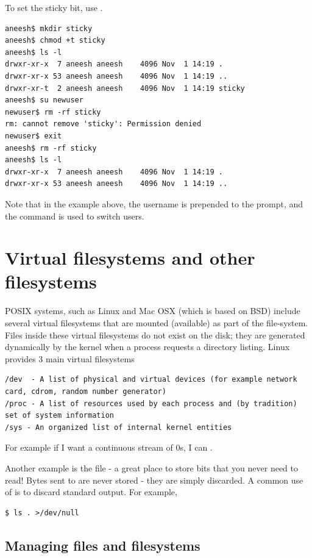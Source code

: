 To set the sticky bit, use .

\begin{lstlisting}
aneesh$ mkdir sticky
aneesh$ chmod +t sticky
aneesh$ ls -l
drwxr-xr-x  7 aneesh aneesh    4096 Nov  1 14:19 .
drwxr-xr-x 53 aneesh aneesh    4096 Nov  1 14:19 ..
drwxr-xr-t  2 aneesh aneesh    4096 Nov  1 14:19 sticky
aneesh$ su newuser
newuser$ rm -rf sticky
rm: cannot remove 'sticky': Permission denied
newuser$ exit
aneesh$ rm -rf sticky
aneesh$ ls -l
drwxr-xr-x  7 aneesh aneesh    4096 Nov  1 14:19 .
drwxr-xr-x 53 aneesh aneesh    4096 Nov  1 14:19 ..
\end{lstlisting}

Note that in the example above, the username is prepended to the prompt, and the command  is used to switch users.

\section{Virtual filesystems and other filesystems}

POSIX systems, such as Linux and Mac OSX (which is based on BSD) include several virtual filesystems that are mounted (available) as part of the file-system. Files inside these virtual filesystems do not exist on the disk; they are generated dynamically by the kernel when a process requests a directory listing. Linux provides 3 main virtual filesystems

\begin{lstlisting}
/dev  - A list of physical and virtual devices (for example network card, cdrom, random number generator)
/proc - A list of resources used by each process and (by tradition) set of system information
/sys - An organized list of internal kernel entities
\end{lstlisting}

For example if I want a continuous stream of 0s, I can .

Another example is the file  - a great place to store bits that you never need to read! Bytes sent to  are never stored - they are simply discarded. A common use of  is to discard standard output. For example,

\begin{lstlisting}
$ ls . >/dev/null
\end{lstlisting}

\subsection{Managing files and filesystems}

